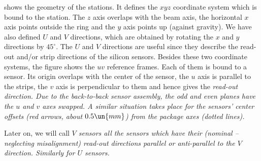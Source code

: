 

 shows the geometry of the  stations. It defines the $xyz$ coordinate system which is bound to the station. The $z$ axis overlaps with the beam axis, the horizontal $x$ axis points outside the  ring and the $y$ axis points up (against gravity). We have also defined $U$ and $V$ directions, which are obtained by rotating the $x$ and $y$ directions by $45^\circ$. The $U$ and $V$ directions are useful since they describe the read-out and/or strip directions of the silicon sensors. Besides these two coordinate systems, the figure shows the $uv$ reference frames. Each of them is bound to a sensor. Its origin overlaps with the center of the sensor, the $u$ axis is parallel to the strips, the $v$ axis is perpendicular to them and hence gives the \em{read-out direction}. Due to the back-to-back sensor assembly, the odd and even planes have the $u$ and $v$ axes swapped. A similar situation takes place for the sensors' center offsets (red arrows, about $0.5\un{mm}$) from the package axes (dotted lines).

Later on, we will call \em{$V$ sensors} all the sensors which have their (nominal -- neglecting misalignment) read-out directions parallel or anti-parallel to the $V$ direction. Similarly for $U$ sensors.


